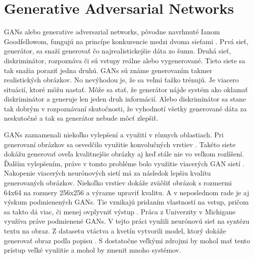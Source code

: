 \section{Generative Adversarial Networks}
GANs alebo generative adversarial networks, pôvodne navrhnuté Ianom Goodfellowom, fungujú na princípe konkurencie medzi dvoma sieťami \cite{GAN}.
Prvá sieť, generátor, sa snaží generovať čo najrealistickejšie dáta zo šumu. Druhá sieť, diskriminátor,  rozpoznáva či sú vstupy reálne alebo vygenerované.
Tieto siete sa tak snažia poraziť jedna druhú. GANs sú známe generovaním takmer realistických obrázkov.
No nevýhodou je, že sa veľmi ťažko trénujú. Je viacero situácií, ktoré môžu nastať. Môže sa stať, že generátor nájde systém ako oklamať diskriminátor a generuje len jeden druh informácií.
Alebo diskriminátor sa stane tak dobrým v rozpoznávaní skutočnosti, že vyhodnotí všetky generované dáta za neskutočné a tak sa generátor nebude môcť zlepšiť.

GANs zaznamenali niekoľko vylepšení a využití v rôznych oblastiach. Pri generovaní obrázkov sa osvedčilo využitie konvolučných vrstiev \cite{DCGAN}.
Takéto siete dokážu generovať oveľa kvalitnejšie obrázky aj keď stále nie vo veľkom rozlíšení.
Ďalším vylepšením, práve v tomto probléme bolo využitie viacerých GAN sietí \cite{stackGAN}. Nakopenie viacerých neurónových sietí má za následok lepšiu kvalitu generovaných obrázkov.
Niekoľko vrstiev dokáže zväčšiť obrázok s rozmermi 64x64 na rozmery 256x256 a výrazne upraviť kvalitu. A v neposlednom rade je aj výskum podmienených GANs.
Tie vznikajú pridaním vlastností na vstup, pričom sa takto dá viac, či menej ovplyvniť výstup \cite{conGAN}.
Práca z Univerzity v Michigane využíva práve podmienené GANs. V tejto práci využili neurónovú sieť na syntézu textu na obraz.
Z datasetu vtáctva a kvetín vytvorili model, ktorý dokáže generovať obraz podľa popisu \cite{text2image}.
S dostatočne veľkými zdrojmi by mohol mať tento prístup veľké využitie a mohol by zmeniť mnoho systémov. 
